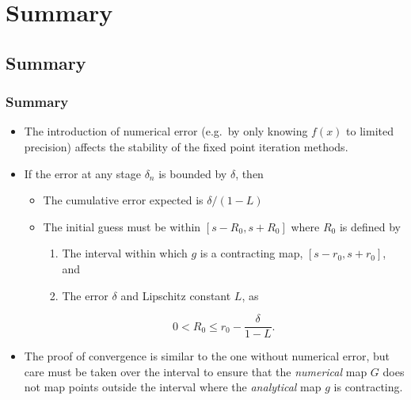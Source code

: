 \documentclass{beamer}
\begin{document}
\begin{frame}

\end{frame}

\section{Summary}


\subsection{Summary}

\begin{frame}
  \frametitle{Summary}

  \begin{itemize}
  \item The introduction of numerical error (e.g.\ by only knowing
    $f(x)$ to limited precision) affects the stability of the fixed
    point iteration methods.
  \item If the error at any stage $\delta_n$ is bounded by $\delta$, then
    \begin{itemize}
    \item The cumulative error expected is $\delta / (1 - L)$
    \item The initial guess must be within $[s - R_0, s + R_0]$ where
      $R_0$ is defined by
      \begin{enumerate}
      \item The interval within which $g$ is a contracting map, $[s -
        r_0, s + r_0]$, and
      \item The error $\delta$ and Lipschitz constant $L$, as
      \end{enumerate}
      \begin{equation*}
        0 < R_0 \leq r_0 - \frac{\delta}{1-L}.
      \end{equation*}
    \end{itemize}
  \item The proof of convergence is similar to the one without
    numerical error, but care must be taken over the interval to
    ensure that the \emph{numerical} map $G$ does not map points
    outside the interval where the \emph{analytical} map $g$ is
    contracting.
  \end{itemize}

\end{frame}
\end{document}
